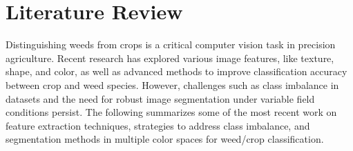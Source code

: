 \documentclass[letterpaper]{report}
\begin{document}
%
%
%
%
%


\chapter{Literature Review}
\label{section:literature}
 
Distinguishing weeds from crops is a critical computer vision task in precision agriculture. Recent research has explored various image features, like texture, shape, and color, as well as advanced methods to improve classification accuracy between crop and weed species. However, challenges such as class imbalance in datasets and the need for robust image segmentation under variable field conditions persist. The following summarizes some of the most recent work on feature extraction techniques, strategies to address class imbalance, and segmentation methods in multiple color spaces for weed/crop classification.
\end{document}
